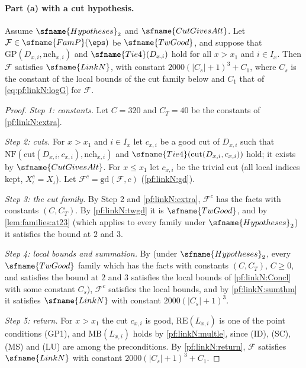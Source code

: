 \paragraph{Part (a) with a cut hypothesis.}

\begin{theorem}\label{pf:linkN:famthm}
Assume $\sfname{Hypotheses}_2$ and $\sfname{CutGivesAlt}$. Let $\mathcal F\in\sfname{FamP}(\eps)$ be $\sfname{TwGood}$, and suppose that
$\mathrm{GP}(D_{x,i},\mathrm{nch}_{x,i})$ and $\sfname{Tie4}(D_{x,i})$ hold for all $x>x_1$ and $i\in I_x$. Then $\mathcal F$
satisfies $\sfname{LinkN}$, with constant $2000(|C_s|+1)^3+C_1$, where $C_s$ is the constant of the local bounds of the cut family
below and $C_1$ that of \eqref{eq:pf:linkN:logG} for $\mathcal F$.
\end{theorem}

\begin{proof}
\emph{Step 1: constants.} Let $C=320$ and $C_T=40$ be the constants of \cref{pf:linkN:extra}.

\emph{Step 2: cuts.} For $x>x_1$ and $i\in I_x$ let $c_{x,i}$ be a good cut of $D_{x,i}$ such that
$\mathrm{NF}(\mathrm{cut}(D_{x,i},c_{x,i}),\mathrm{nch}_{x,i})$ and $\sfname{Tie4}(\mathrm{cut}(D_{x,i},c_{x,i}))$ hold; it exists by
$\sfname{CutGivesAlt}$. For $x\le x_1$ let $c_{x,i}$ be the trivial cut (all local indices kept, $X^c_\iota=X_\iota$). Let
$\mathcal F^c=\mathrm{gd}(\mathcal F,c)$ (\cref{pf:linkN:gd}).

\emph{Step 3: the cut family.} By Step 2 and \cref{pf:linkN:extra}, $\mathcal F^c$ has the facts with constants $(C,C_T)$. By
\cref{pf:linkN:twgd} it is $\sfname{TwGood}$, and by \cref{lem:families:at23} (which applies to every family under
$\sfname{Hypotheses}_2$) it satisfies the bound at $2$ and $3$.

\emph{Step 4: local bounds and summation.} By  (under $\sfname{Hypotheses}_2$, every
$\sfname{TwGood}$ family which has the facts with constants $(C,C_T)$, $C\ge0$, and satisfies the bound at $2$ and $3$ satisfies the
local bounds of \cref{pf:linkN:Concl} with some constant $C_s$), $\mathcal F^c$ satisfies the local bounds, and by
\cref{pf:linkN:sumthm} it satisfies $\sfname{LinkN}$ with constant $2000(|C_s|+1)^3$.

\emph{Step 5: return.} For $x>x_1$ the cut $c_{x,i}$ is good, $\mathrm{RE}(L_{x,i})$ is one of the point conditions (GP1), and
$\mathrm{MB}(L_{x,i})$ holds by \cref{pf:linkN:multle}, since (ID), (SC), (MS) and (LU) are among the preconditions. By
\cref{pf:linkN:return}, $\mathcal F$ satisfies $\sfname{LinkN}$ with constant $2000(|C_s|+1)^3+C_1$.
\end{proof}

